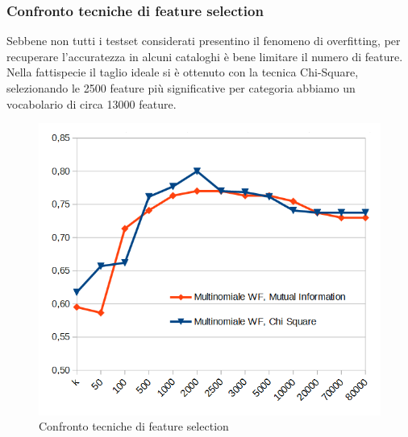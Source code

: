 \documentclass{article}
\theoremstyle{plain}
\theoremstyle{definition}
\begin{document}
\newpage
\subsubsection{Confronto tecniche di feature selection}
Sebbene non tutti i testset considerati presentino il fenomeno di overfitting, per recuperare l'accuratezza in alcuni cataloghi è bene limitare il numero di feature.
Nella fattispecie il taglio ideale si è ottenuto con la tecnica Chi-Square, selezionando le 2500 feature più significative per categoria abbiamo un vocabolario di circa 13000 feature.

\begin{figure}[htbp]
\begin{center}
\includegraphics[scale=0.70]{img/gr1.png}
\caption{Confronto tecniche di feature selection}
\end{center}
\end{figure}
\end{document}
